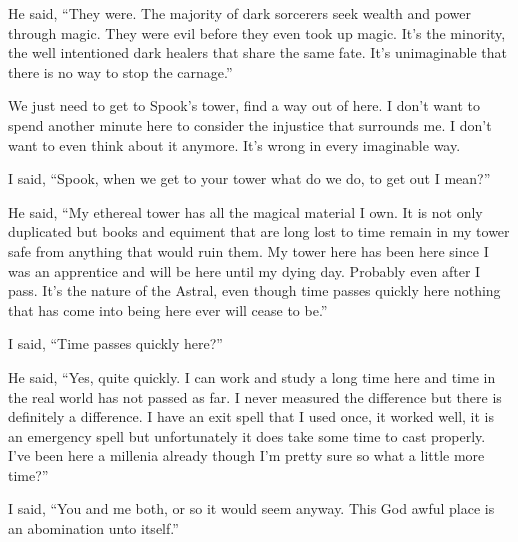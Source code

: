 He said, ``They were. The majority of dark sorcerers seek wealth and power through magic. They were evil before they even took up magic. It's the minority, the well intentioned dark healers that share the same fate. It's unimaginable that there is no way to stop the carnage.''

We just need to get to Spook's tower, find a way out of here. I don't want to spend another minute here to consider the injustice that surrounds me. I don't want to even think about it anymore. It's wrong in every imaginable way.

I said, ``Spook, when we get to your tower what do we do, to get out I mean?''

He said, ``My ethereal tower has all the magical material I own. It is not only duplicated but books and equiment that are long lost to time remain in my tower safe from anything that would ruin them. My tower here has been here since I was an apprentice and will be here until my dying day. Probably even after I pass. It's the nature of the Astral, even though time passes quickly here nothing that has come into being here ever will cease to be.''

I said, ``Time passes quickly here?''

He said, ``Yes, quite quickly. I can work and study a long time here and time in the real world has not passed as far. I never measured the difference but there is definitely a difference. I have an exit spell that I used once, it worked well, it is an emergency spell but unfortunately it does take some time to cast properly. I've been here a millenia already though I'm pretty sure so what a little more time?''

I said, ``You and me both, or so it would seem anyway. This God awful place is an abomination unto itself.''









